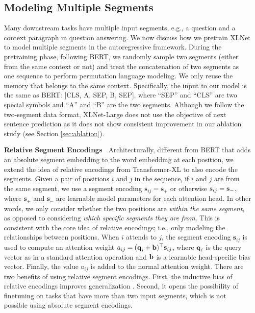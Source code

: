 \subsection{Modeling Multiple Segments}

Many downstream tasks have multiple input segments, e.g., a question and a context paragraph in question answering. We now discuss how we pretrain XLNet to model multiple segments in the autoregressive framework. During the pretraining phase, following BERT, we randomly sample two segments (either from the same context or not) and treat the concatenation of two segments as one sequence to perform permutation language modeling. We only reuse the memory that belongs to the same context. Specifically, the input to our model is the same as BERT: [CLS, A, SEP, B, SEP], where ``SEP'' and ``CLS'' are two special symbols and ``A'' and ``B'' are the two segments.
Although we follow the two-segment data format, XLNet-Large does not use the objective of next sentence prediction \cite{devlin2018bert} as it does not show consistent improvement in our ablation study (see Section \ref{sec:ablation}).

\textbf{Relative Segment Encodings~}
Architecturally, different from BERT that adds an absolute segment embedding to the word embedding at each position, we extend the idea of relative encodings from Transformer-XL to also encode the segments. Given a pair of positions $i$ and $j$ in the sequence, if $i$ and $j$ are from the same segment, we use a segment encoding $\mathbf{s}_{ij} = \mathbf{s}_+$ or otherwise $\boldsymbol{\mathbf{s}}_{ij} = \boldsymbol{\mathbf{s}}_-$, where $\mathbf{s}_+$ and $\mathbf{s}_-$ are learnable model parameters for each attention head. In other words, we only consider whether the two positions are \textit{within the same segment}, as opposed to considering \textit{which specific segments they are from}. This is consistent with the core idea of relative encodings; i.e., only modeling the relationships between positions. When $i$ attends to $j$, the segment encoding $\mathbf{s}_{ij}$ is used to compute an attention weight $a_{ij} = (\boldsymbol{\mathbf{q}}_i + \boldsymbol{\mathbf{b}})^\top \boldsymbol{\mathbf{s}}_{ij}$, where $\boldsymbol{\mathbf{q}}_i$ is the query vector as in a standard attention operation and $\boldsymbol{\mathbf{b}}$ is a learnable head-specific bias vector. Finally, the value $a_{ij}$ is added to the normal attention weight. There are two benefits of using relative segment encodings. First, the inductive bias of relative encodings improves generalization \cite{dai2019transformer}. Second, it opens the possibility of finetuning on tasks that have more than two input segments, which is not possible using absolute segment encodings.

